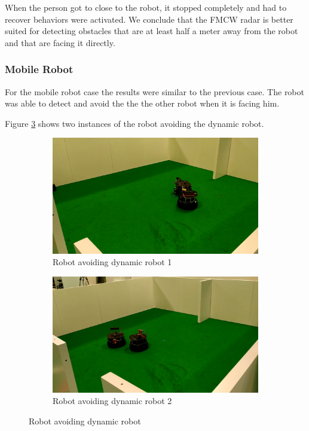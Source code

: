When the person got to close to the robot, it stopped completely and had to recover behaviors were activated. We conclude that the \ac{FMCW} \ac{radar} is better suited for detecting obstacles that are at least half a meter away from the robot and that are facing it directly. 
\subsubsection{Mobile Robot}
For the mobile robot case the results were similar to the previous case. The robot was able to detect and avoid the the the other robot when it is facing him.

Figure \ref{fig:exp3robot} shows two instances of the robot avoiding the dynamic robot.
\begin{figure}[ht!]
  \centering
  \begin{subfigure}[b]{0.49\linewidth}
    \includegraphics[width=\linewidth]{imgs/chapter5/exp3robot1.png}
     \caption{Robot avoiding dynamic robot 1}
     \label{fig::exp3robot1}
  \end{subfigure}
  \begin{subfigure}[b]{0.49\linewidth}
    \includegraphics[width=\linewidth]{imgs/chapter5/exp3robot2.png}
    \caption{Robot avoiding dynamic robot 2}
    \label{fig::exp3robot2}
  \end{subfigure}
  \caption{Robot avoiding dynamic robot }
  \label{fig:exp3robot}
\end{figure}

